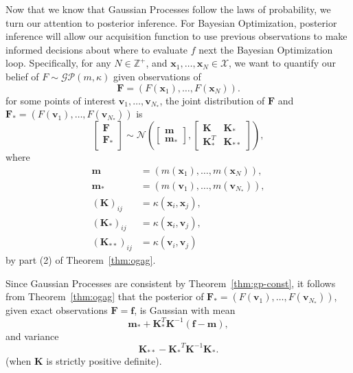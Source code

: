Now that we know that Gaussian Processes follow the laws of probability, we turn our attention to posterior inference.
For Bayesian Optimization, posterior inference will allow our acquisition function to use previous observations to make informed decisions about where to evaluate $f$ next the Bayesian Optimization loop.
Specifically, for any $N \in \mathbb{Z}^{+}$, and $\mathbf{x}_1, \ldots, \mathbf{x}_N \in \mathcal{X}$, we want to quantify our belief of $F \sim \mathcal{GP}(m, \kappa)$
given observations of
\begin{equation*}
    \mathbf{F} = (F(\mathbf{x}_1), \dots, F(\mathbf{x}_N)). 
\end{equation*}
for some points of interest $\mathbf{v}_{1}, \dots, \mathbf{v}_{N_{*}}$,
the joint distribution of $\mathbf{F}$ and $\mathbf{F}_* = (F(\mathbf{v}_1), \dots, F(\mathbf{v}_{N_*}))$ is
\begin{equation*}
    \begin{bmatrix}
        \mathbf{F} \\
        \mathbf{F}_{*} \\
    \end{bmatrix}
    \sim
    \mathcal{N}\left(
    \begin{bmatrix}
            \mathbf{m} \\
            \mathbf{m}_{*}
        \end{bmatrix}
    ,
    \begin{bmatrix}
            \mathbf{K} & \mathbf{K}_* \\
            \mathbf{K}_*^T & \mathbf{K}_{* *}
        \end{bmatrix}
    \right),
\end{equation*}
where
\begin{align*}
    \mathbf{m} & = (m(\mathbf{x}_1), \dots, m(\mathbf{x}_N)), \\
    \mathbf{m_*} & = (m(\mathbf{v}_1), \dots, m(\mathbf{v}_{N_{*}})), \\
    (\mathbf{K})_{ij} & = \kappa(\mathbf{x}_i, \mathbf{x}_j), \\
    (\mathbf{K}_*)_{ij} & = \kappa(\mathbf{x}_i, \mathbf{v}_j), \\
    (\mathbf{K}_{* *})_{ij} & = \kappa(\mathbf{v}_i, \mathbf{v}_j)
\end{align*}
by part (2) of Theorem~\ref{thm:ogag}.

Since Gaussian Processes are consistent by Theorem~\ref{thm:gp-const}, it follows from Theorem~\ref{thm:ogag} that the posterior
of $\mathbf{F}_* = (F(\mathbf{v}_1), \dots, F(\mathbf{v}_{N_*}))$, given exact observations $\mathbf{F} = \mathbf{f}$, is Gaussian with mean
\begin{equation}
    \label{eq:noisless-post-mean}
    \mathbf{m}_* + \mathbf{K}_*^T \mathbf{K}^{-1} (\mathbf{f} - \mathbf{m}),
\end{equation}
and variance
\begin{equation}
    \label{eq:noiseless-post-var}
    \mathbf{K}_{* *} - \mathbf{K_*}^{T} \mathbf{K}^{-1} \mathbf{K_*}.
\end{equation}
(when $\mathbf{K}$ is strictly positive definite).

